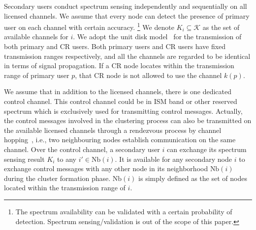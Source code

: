 \documentclass[10pt,journal,compsoc]{IEEEtran}
\theoremstyle{mytheoremstyle}
\theoremstyle{mytheoremstyle}
\theoremstyle{mytheoremstyle}
\begin{document}
Secondary users conduct spectrum sensing independently and sequentially on all licensed channels.
We assume that every node can detect the presence of primary user on each channel with certain accuracy. \footnote{The spectrum availability can be validated with a certain probability of detection. Spectrum sensing/validation is out of the scope of this paper.}
We denote $K_i \subseteq \mathcal{K}$ as the set of available channels for $i$.
%
%
We adopt the unit disk model~\cite{unitDiskModel} for the transmission of both primary and CR users.
Both primary users and CR users have fixed transmission ranges respectively, and all the channels are regarded to be identical in terms of signal propagation.
If a CR node locates within the transmission range of primary user $p$, that CR node is not allowed to use the channel $k(p)$.

We assume that in addition to the licensed channels, there is one dedicated control channel.
This control channel could be in ISM band or other reserved spectrum which is exclusively used for transmitting control messages.
Actually, the control messages involved in the clustering process can also be transmitted on the available licensed channels through a rendezvous process by channel hopping~\cite{channelHopping_Rendezvous_2014, Gu_distributed_rendezvous_2014}, i.e., two neighbouring nodes establish communication on the same channel.
Over the control channel, a secondary user $i$ can exchange its spectrum sensing result $K_i$ to any $i' \in \text{Nb}(i)$.
It is available for any secondary node $i$ to exchange control messages with any other node in its neighborhood $\text{Nb}(i)$ during the cluster formation phase.
$\text{Nb}(i)$ is simply defined as the set of nodes located within the transmission range of $i$. 
\end{document}
